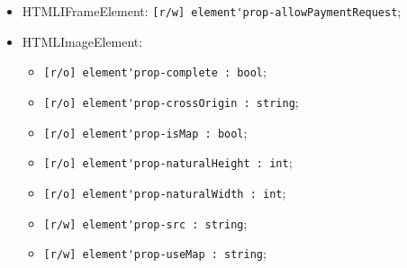 \documentclass[a4paper, 14pt]{extarticle}
\newenvironment{icItems}
	{ \begin{itemize} [noitemsep,nolistsep] }
	{ \end{itemize} }
\begin{document}
\begin{icItems}
	\item HTMLIFrameElement: \lstinline|[r/w] element'prop-allowPaymentRequest|;
	
	\item HTMLImageElement:
	\begin{icItems}
		\item \lstinline|[r/o] element'prop-complete : bool|;
		\item \lstinline|[r/o] element'prop-crossOrigin : string|;
		\item \lstinline|[r/o] element'prop-isMap : bool|;
		\item \lstinline|[r/o] element'prop-naturalHeight : int|;
		\item \lstinline|[r/o] element'prop-naturalWidth : int|;
		\item \lstinline|[r/w] element'prop-src : string|;
		\item \lstinline|[r/w] element'prop-useMap : string|;
	\end{icItems}
	

\end{icItems}
\end{document}
